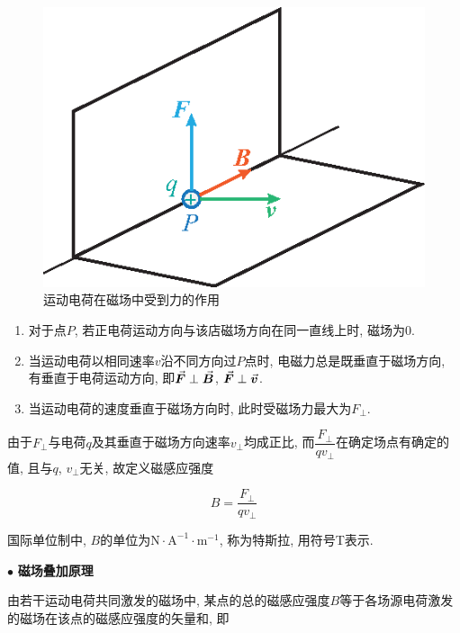 \begin{figure}[H]
	\centering
	\includegraphics[scale=1.0]{C8-fig2.eps}
	\caption{运动电荷在磁场中受到力的作用}
\end{figure}

\begin{enumerate}[itemindent=1em]
	
	\item 对于点$P$, 若正电荷运动方向与该店磁场方向在同一直线上时, 磁场为0. 
	
	\item 当运动电荷以相同速率$v$沿不同方向过$P$点时, 电磁力总是既垂直于磁场方向, 有垂直于电荷运动方向, 即$\va*{F} \perp \va*{B}$, $\va*{F} \perp \va*{v}$. 
	
	\item 当运动电荷的速度垂直于磁场方向时, 此时受磁场力最大为$F_{\bot}$. 
	
\end{enumerate}

由于$F_{\bot}$与电荷$q$及其垂直于磁场方向速率$v_{\bot}$均成正比, 而$\dfrac{F_{\bot}}{qv_{\bot}}$在确定场点有确定的值, 且与$q$, $v_{\bot}$无关, 故定义磁感应强度

\begin{equation}
	B = \dfrac{F_{\bot}}{q v_{\bot}} \label{C8-eq1}
\end{equation}

国际单位制中, $B$的单位为$\textrm{N} \cdot \textrm{A}^{-1} \cdot \textrm{m}^{-1}$, 称为特斯拉, 用符号T表示. 

$\bullet$ \textbf{磁场叠加原理}

由若干运动电荷共同激发的磁场中, 某点的总的磁感应强度$B$等于各场源电荷激发的磁场在该点的磁感应强度的矢量和, 即

